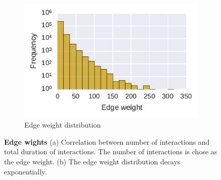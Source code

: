 \begin{figure}[htb]
	\begin{subfigure}[b]{0.49\textwidth}
	\centering
	\includegraphics[width=1.0\textwidth]{Figures/n3-edgeWeightDist.pdf}
	\caption[Edge weight distribution]{Edge weight distribution}
	\label{fig:edgeWdist}
	\end{subfigure}
	\caption[Edge wights]{\textbf{Edge wights} (a) Correlation between number of interactions and total duration of interactions. The number of interactions is chose as the edge weight. (b)  The edge weight distribution decays exponentially.}
	\label{fig:edges}
\end{figure}